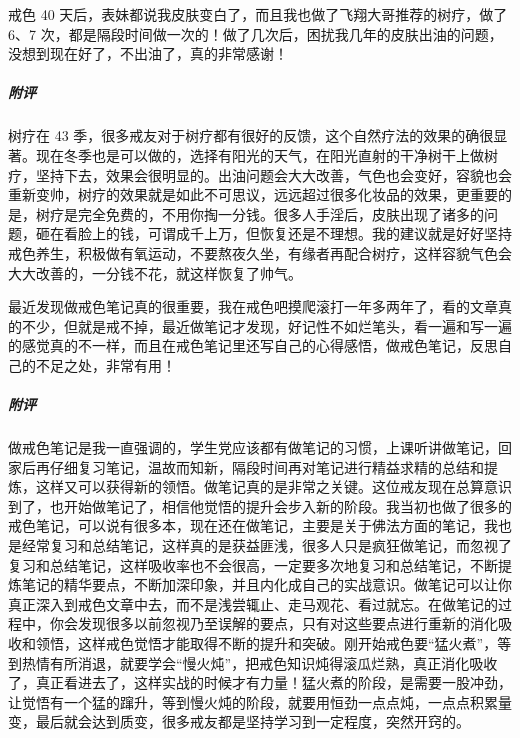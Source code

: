 \begin{case}
    戒色 40 天后，表妹都说我皮肤变白了，而且我也做了飞翔大哥推荐的树疗，做了 6、7 次，都是隔段时间做一次的！做了几次后，困扰我几年的皮肤出油的问题，没想到现在好了，不出油了，真的非常感谢！
    \subparagraph{附评} 树疗在 43 季，很多戒友对于树疗都有很好的反馈，这个自然疗法的效果的确很显著。现在冬季也是可以做的，选择有阳光的天气，在阳光直射的干净树干上做树疗，坚持下去，效果会很明显的。出油问题会大大改善，气色也会变好，容貌也会重新变帅，树疗的效果就是如此不可思议，远远超过很多化妆品的效果，更重要的是，树疗是完全免费的，不用你掏一分钱。很多人手淫后，皮肤出现了诸多的问题，砸在看脸上的钱，可谓成千上万，但恢复还是不理想。我的建议就是好好坚持戒色养生，积极做有氧运动，不要熬夜久坐，有缘者再配合树疗，这样容貌气色会大大改善的，一分钱不花，就这样恢复了帅气。
\end{case}

\begin{case}
    最近发现做戒色笔记真的很重要，我在戒色吧摸爬滚打一年多两年了，看的文章真的不少，但就是戒不掉，最近做笔记才发现，好记性不如烂笔头，看一遍和写一遍的感觉真的不一样，而且在戒色笔记里还写自己的心得感悟，做戒色笔记，反思自己的不足之处，非常有用！
    \subparagraph{附评} 做戒色笔记是我一直强调的，学生党应该都有做笔记的习惯，上课听讲做笔记，回家后再仔细复习笔记，温故而知新，隔段时间再对笔记进行精益求精的总结和提炼，这样又可以获得新的领悟。做笔记真的是非常之关键。这位戒友现在总算意识到了，也开始做笔记了，相信他觉悟的提升会步入新的阶段。我当初也做了很多的戒色笔记，可以说有很多本，现在还在做笔记，主要是关于佛法方面的笔记，我也是经常复习和总结笔记，这样真的是获益匪浅，很多人只是疯狂做笔记，而忽视了复习和总结笔记，这样吸收率也不会很高，一定要多次地复习和总结笔记，不断提炼笔记的精华要点，不断加深印象，并且内化成自己的实战意识。做笔记可以让你真正深入到戒色文章中去，而不是浅尝辄止、走马观花、看过就忘。在做笔记的过程中，你会发现很多以前忽视乃至误解的要点，只有对这些要点进行重新的消化吸收和领悟，这样戒色觉悟才能取得不断的提升和突破。刚开始戒色要“猛火煮”，等到热情有所消退，就要学会“慢火炖”，把戒色知识炖得滚瓜烂熟，真正消化吸收了，真正看进去了，这样实战的时候才有力量！猛火煮的阶段，是需要一股冲劲，让觉悟有一个猛的蹿升，等到慢火炖的阶段，就要用恒劲一点点炖，一点点积累量变，最后就会达到质变，很多戒友都是坚持学习到一定程度，突然开窍的。
\end{case}

